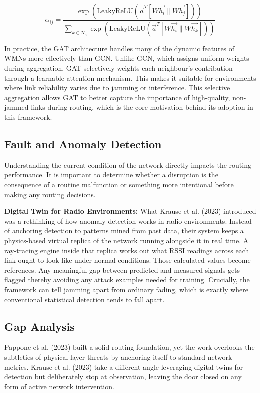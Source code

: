 \documentclass[conference]{IEEEtran}
\begin{document}
\begin{equation}
\alpha_{ij} = \frac{\exp\left(\text{LeakyReLU}\left(\vec{a}^T\left[W\vec{h_i} \| W\vec{h_j}\right]\right)\right)}{\sum_{k \in \mathcal{N}_i} \exp\left(\text{LeakyReLU}\left(\vec{a}^T\left[W\vec{h_i} \| W\vec{h_k}\right]\right)\right)}
\label{eq:gat}
\end{equation}

In practice, the GAT architecture handles many of the dynamic features of WMNs more effectively than GCN. Unlike GCN, which assigns uniform weights during aggregation, GAT selectively weights each neighbour's contribution through a learnable attention mechanism. This makes it suitable for environments where link reliability varies due to jamming or interference. This selective aggregation allows GAT to better capture the importance of high-quality, non-jammed links during routing, which is the core motivation behind its adoption in this framework.

\subsection{Fault and Anomaly Detection}

Understanding the current condition of the network directly impacts the routing performance. It is important to determine whether a disruption is the consequence of a routine malfunction or something more intentional before making any routing decisions.

\textbf{Digital Twin for Radio Environments:} What Krause et al. (2023) introduced was a rethinking of how anomaly detection works in radio environments. Instead of anchoring detection to patterns mined from past data, their system keeps a physics-based virtual replica of the network running alongside it in real time. A ray-tracing engine inside that replica works out what RSSI readings across each link ought to look like under normal conditions. Those calculated values become references. Any meaningful gap between predicted and measured signals gets flagged thereby avoiding any attack examples needed for training. Crucially, the framework can tell jamming apart from ordinary fading, which is exactly where conventional statistical detection tends to fall apart.

\subsection{Gap Analysis}

Pappone et al. (2023) built a solid routing foundation, yet the work overlooks the subtleties of physical layer threats by anchoring itself to standard network metrics. Krause et al. (2023) take a different angle leveraging digital twins for detection but deliberately stop at observation, leaving the door closed on any form of active network intervention.
\end{document}
